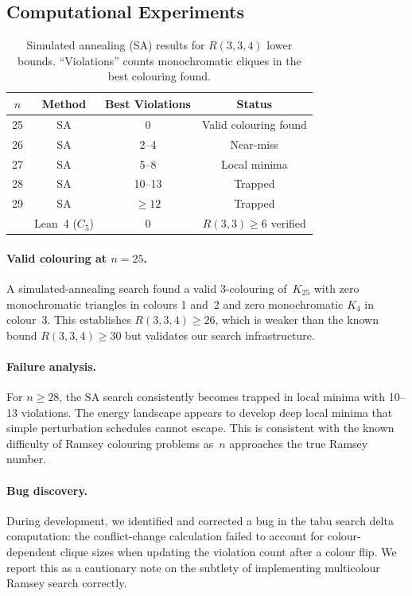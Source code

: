 \documentclass[11pt,a4paper]{article}
\begin{document}
\subsection{Computational Experiments}

\begin{table}[ht]
\centering
\caption{Simulated annealing (SA) results for $R(3,3,4)$ lower bounds.
  ``Violations'' counts monochromatic cliques in the best colouring found.}
\label{tab:ramsey}
\begin{tabular}{@{}cccc@{}}
\toprule
$n$ & Method & Best Violations & Status \\
\midrule
25 & SA & 0 & Valid colouring found \\
26 & SA & 2--4 & Near-miss \\
27 & SA & 5--8 & Local minima \\
28 & SA & 10--13 & Trapped \\
29 & SA & $\geq 12$ & Trapped \\
\addlinespace
6  & Lean~4 ($C_5$) & 0 & $R(3,3) \geq 6$ verified \\
\bottomrule
\end{tabular}
\end{table}

\paragraph{Valid colouring at $n=25$.}
A simulated-annealing search found a valid 3-colouring of~$K_{25}$ with
zero monochromatic triangles in colours 1 and~2 and zero monochromatic
$K_4$ in colour~3. This establishes $R(3,3,4) \geq 26$, which is weaker
than the known bound $R(3,3,4) \geq 30$ but validates our search
infrastructure.

\paragraph{Failure analysis.}
For $n \geq 28$, the SA search consistently becomes trapped in local minima
with 10--13 violations. The energy landscape appears to develop deep local
minima that simple perturbation schedules cannot escape. This is consistent
with the known difficulty of Ramsey colouring problems as~$n$ approaches the
true Ramsey number.

\paragraph{Bug discovery.}
During development, we identified and corrected a bug in the tabu search
delta computation: the conflict-change calculation failed to account for
colour-dependent clique sizes when updating the violation count after a colour
flip. We report this as a cautionary note on the subtlety of implementing
multicolour Ramsey search correctly.
\end{document}
